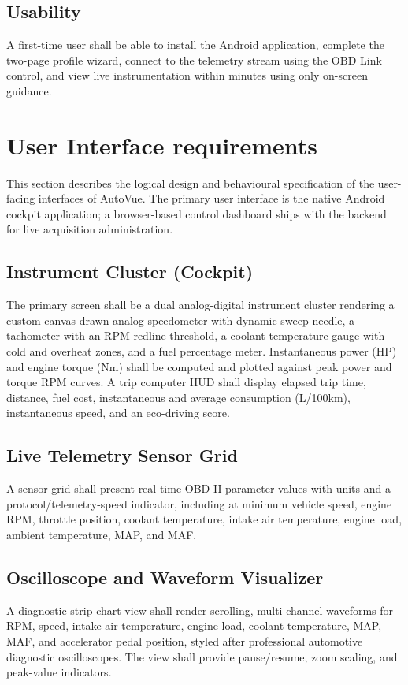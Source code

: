 \documentclass[10pt,a4paper]{report}
\begin{document}
\subsection{Usability}
A first-time user shall be able to install the Android application, complete the two-page profile wizard, connect to the telemetry stream using the OBD Link control, and view live instrumentation within minutes using only on-screen guidance. \par

\section{User Interface requirements}
This section describes the logical design and behavioural specification of the user-facing interfaces of AutoVue. The primary user interface is the native Android cockpit application; a browser-based control dashboard ships with the backend for live acquisition administration.

\subsection{Instrument Cluster (Cockpit)}
The primary screen shall be a dual analog-digital instrument cluster rendering a custom canvas-drawn analog speedometer with dynamic sweep needle, a tachometer with an RPM redline threshold, a coolant temperature gauge with cold and overheat zones, and a fuel percentage meter. Instantaneous power (HP) and engine torque (Nm) shall be computed and plotted against peak power and torque RPM curves. A trip computer HUD shall display elapsed trip time, distance, fuel cost, instantaneous and average consumption (L/100km), instantaneous speed, and an eco-driving score. \par

\subsection{Live Telemetry Sensor Grid}
A sensor grid shall present real-time OBD-II parameter values with units and a protocol/telemetry-speed indicator, including at minimum vehicle speed, engine RPM, throttle position, coolant temperature, intake air temperature, engine load, ambient temperature, MAP, and MAF. \par

\subsection{Oscilloscope and Waveform Visualizer}
A diagnostic strip-chart view shall render scrolling, multi-channel waveforms for RPM, speed, intake air temperature, engine load, coolant temperature, MAP, MAF, and accelerator pedal position, styled after professional automotive diagnostic oscilloscopes. The view shall provide pause/resume, zoom scaling, and peak-value indicators. \par
\end{document}
